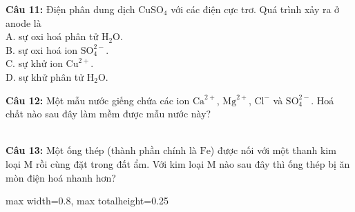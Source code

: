 \documentclass[12pt,a4paper]{article}
\begin{document}
\par\noindent\begin{minipage}{\linewidth}
\noindent \textbf{Câu 11:} Điện phân dung dịch $\text{CuSO}_4$ với các điện cực trơ. Quá trình xảy ra ở anode là\\
\noindent A. sự oxi hoá phân tử $\text{H}_2\text{O}$.\\
\noindent B. sự oxi hoá ion $\text{SO}_4^{2-}$.\\
\noindent C. sự khử ion $\text{Cu}^{2+}$.\\
\noindent D. sự khử phân tử $\text{H}_2\text{O}$.
\end{minipage}\par\vspace{0.12cm}

\par\noindent\begin{minipage}{\linewidth}
\noindent \textbf{Câu 12:} Một mẫu nước giếng chứa các ion $\text{Ca}^{2+}$, $\text{Mg}^{2+}$, $\text{Cl}^{-}$ và $\text{SO}_4^{2-}$. Hoá chất nào sau đây làm mềm được mẫu nước này?\\
\noindent{}\\
\noindent{}
\end{minipage}\par\vspace{0.12cm}

\par\noindent\begin{minipage}{\linewidth}
\noindent \textbf{Câu 13:} Một ống thép (thành phần chính là $\text{Fe}$) được nối với một thanh kim loại M rồi cùng đặt trong đất ẩm. Với kim loại M nào sau đây thì ống thép bị ăn mòn điện hoá nhanh hơn?\\
\begin{center}
\begin{adjustbox}{max width=0.8\linewidth, max totalheight=0.25\textheight}
\end{adjustbox}
\end{center}
\noindent{}
\end{minipage}\par\vspace{0.12cm}
\end{document}
